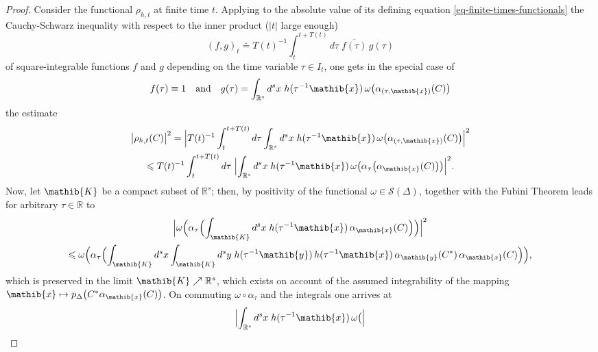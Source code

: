 \documentclass[11pt,twoside,openright]{report}
\theoremstyle{definition}
\theoremstyle{plain}
\theoremstyle{remark}
\theoremstyle{assumption}
\newcommand{\abs}[1]{\lvert #1 \rvert}
\newcommand{\babs}[1]{\bigl\lvert #1 \bigr\rvert}
\newcommand{\Babs}[1]{\Bigl\lvert #1 \Bigr\rvert}
\newcommand{\bpDx}[1]{p_\Delta \bigl( #1 \bigr)}
\newcommand{\Rbb}{\mathbb{R}}
\newcommand{\Kib}{\mathib{K}}
\newcommand{\xib}{\mathib{x}}
\newcommand{\yib}{\mathib{y}}
\newcommand{\Sscr}{\mathscr{S}}
\newcommand{\Rs}{\mathbb{R}^s}
\newcommand{\aibx}{\alpha_\mathib{x}}
\newcommand{\aiby}{\alpha_\mathib{y}}
\begin{document}
\begin{proof}
  Consider the functional $\rho_{h , t}$ at finite time $t$. Applying
  to the absolute value of its defining equation
  \eqref{eq-finite-times-functionals} the Cauchy-Schwarz inequality
  with respect to the inner product ($\abs{t}$ large enough)
  \begin{equation*}
    ( f , g )_t \doteq T ( t )^{-1} \int_t^{t + T ( t )} d \tau \;
    \overline{f ( \tau )} \, g ( \tau )
  \end{equation*}
  of square-integrable functions $f$ and $g$ depending on the time
  variable $\tau \in I_t$, one gets in the special case of
  \begin{equation*}
    f ( \tau ) \equiv 1 \quad \text{and} \quad g ( \tau ) = \int_{\Rs}
    d^s x \; h ( \tau^{-1} \xib ) \, \omega \bigl( \alpha_{( \tau ,
    \xib )} ( C ) \bigr)
  \end{equation*}
  the estimate
  \begin{multline}
    \label{eq-csi-estimate}
    \babs{\rho_{h , t} ( C )}^2 = \Babs{T ( t )^{-1} \int_t^{t + T ( t
    )} d \tau \int_{\Rs} d^s x \; h ( \tau^{-1} \xib ) \, \omega
    \bigl( \alpha_{( \tau , \xib )} ( C ) \bigr)}^2 \\
    \leqslant T ( t )^{-1} \int_t^{t + T ( t )} d \tau \;
    \Babs{\int_{\Rs} d^s x \; h ( \tau^{-1} \xib ) \, \omega \bigl(
    \alpha_\tau \bigl( \aibx ( C ) \bigr) \bigr)}^2 \text{.}
  \end{multline}
  Now, let $\Kib$ be a compact subset of $\Rs$; then, by positivity of
  the functional $\omega \in \Sscr ( \Delta )$,
  \cite[Proposition~2.3.11(b)]{bratteli/robinson:1987} together with
  the Fubini Theorem \cite[II.16.3]{fell/doran:1988a} leads for
  arbitrary $\tau \in \Rbb$ to
  \begin{multline*}
    \Babs{\omega \Bigl( \alpha_\tau \Bigl( \int_\Kib d^s x \; h (
    \tau^{-1} \xib ) \, \aibx ( C ) \Bigr) \Bigr)}^2 \\
    \leqslant \omega \Bigl( \alpha_\tau \Bigl( \int_\Kib d^s x
    \int_\Kib d^s y \; h ( \tau^{-1} \yib ) \, h ( \tau^{-1} \xib ) \,
    \aiby ( C^* ) \, \aibx ( C ) \Bigr) \Bigr) \text{,}
  \end{multline*}
  which is preserved in the limit $\Kib \nearrow \Rs$, which exists
  on account of the assumed integrability of the mapping $\xib \mapsto
  \bpDx{C^* \aibx ( C )}$. On commuting $\omega \circ \alpha_\tau$ and
  the integrals one arrives at
  \begin{multline}
    \label{eq-pos-omega-estimate}
      \Babs{\int_{\Rs} d^s x \; h ( \tau^{-1} \xib ) \, \omega \bigl(
}
\end{multline}
\end{proof}
\end{document}
